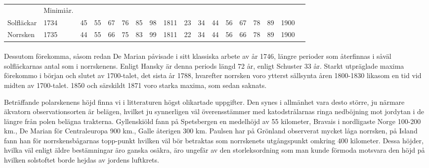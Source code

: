 \documentclass[a4paper, 12pt, oneside, swedish]{article}
\begin{document}
\begin{table}[H]
    \centering
    \footnotesize
    \begin{tabular}{p{12mm} p{10mm} p{2mm} p{2mm} p{2mm} p{2mm} p{2mm} p{2mm} p{4mm} p{2mm} p{2mm} p{2mm} p{2mm} p{2mm} p{2mm} p{2mm} p{2mm} p{4mm}}
        ~ & Minimiår. & ~ & ~ & ~ & ~ & ~ & ~ & ~ & ~ & ~ & ~ & ~ & ~ & ~ & ~ & ~ \\
        Solfläckar & 1734 & 45 & 55 & 67 & 76 & 85 & 98 & 1811 & 23 & 34 & 44 & 56 & 67 & 78 & 89 & 1900 \\
        Norrsken & 1735 & 44 & 55 & 66 & 75 & 83 & 99 & 1811 & 22 & 34 & 44 & 56 & 66 & 78 & 89 & 1900 \\
    \end{tabular}
\end{table}
\paragraph{}
Dessutom förekomma, såsom redan De Marian påvisade i sitt klassiska arbete av år 1746, längre perioder som återfinnas i såväl solfläckarnas antal som i norrskenens. Enligt Hansky är denna periods längd 72 år, enligt Schuster 33 år. Starkt utpräglade maxima förekommo i början och slutet av 1700-talet, det sista år 1788, hvarefter norrsken voro ytterst sällsynta åren 1800-1830 likasom en tid vid midten av 1700-talet. 1850 och särskildt 1871 voro starka maxima, som sedan saknats.

Beträffande polarskenens höjd finna vi i litteraturen högst olikartade uppgifter. Den synes i allmänhet vara desto större, ju närmare äkvatorn observationsorten är belägen, hvilket ju synnerligen väl överensstämmer med katodstrålarnas ringa nedböjning mot jordytan i de längre från polen belägna trakterna. Gyllenskiöld fann på Spetsbergen en medelhöjd av 55 kilometer, Bravais i nordligaste Norge 100-200 km., De Marian för Centraleuropa 900 km., Galle återigen 300 km. Paulsen har på Grönland observerat mycket låga norrsken, på Island fann han för norrskensbågarnas topp-punkt hvilken väl bör betraktas som norrskenets utgångspunkt omkring 400 kilometer. Dessa höjder, hvilka väl enligt äldre bestämningar äro ganska osäkra, äro ungefär av den storleksordning som man kunde förmoda motsvara den höjd på hvilken solstoftet borde hejdas av jordens luftkrets.
\end{document}
